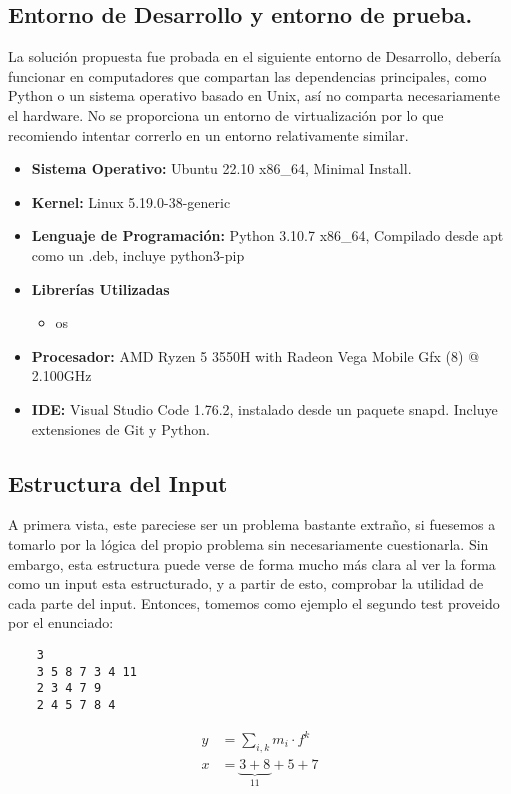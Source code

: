 \documentclass[a4paper]{article}
\begin{document}
\subsection{Entorno de Desarrollo y entorno de prueba.}

La solución propuesta fue probada en el siguiente entorno de Desarrollo, debería funcionar en
computadores que compartan las dependencias principales, como Python o un sistema operativo basado
en Unix, así no comparta necesariamente el hardware. No se proporciona un entorno de virtualización
por lo que recomiendo intentar correrlo en un entorno relativamente similar.

\begin{itemize}
    \item \textbf{Sistema Operativo: } Ubuntu 22.10 x86\_64, Minimal Install.
    \item \textbf{Kernel: }Linux 5.19.0-38-generic
    \item \textbf{Lenguaje de Programación: }Python 3.10.7 x86\_64, Compilado desde apt como un .deb, incluye python3-pip
    \item \textbf{Librerías Utilizadas}
    \begin{itemize}
        \item os
    \end{itemize}
    \item \textbf{Procesador: }AMD Ryzen 5 3550H with Radeon Vega Mobile Gfx (8) @ 2.100GHz 
    \item \textbf{IDE: } Visual Studio Code 1.76.2, instalado desde un paquete snapd. Incluye extensiones
    de Git y Python.
\end{itemize}

\subsection{Estructura del Input}
A primera vista, este pareciese ser un problema bastante extraño, si fuesemos a tomarlo por la lógica
del propio problema sin necesariamente cuestionarla. Sin embargo, esta estructura puede verse de forma mucho
más clara al ver la forma como un input esta estructurado, y a partir de esto, comprobar la
utilidad de cada parte del input. Entonces, tomemos como ejemplo el segundo test proveido por el
enunciado:
\begin{verbatim}
    3 
    3 5 8 7 3 4 11
    2 3 4 7 9 
    2 4 5 7 8 4
\end{verbatim}


\begin{align*}
y &=  \sum\limits_{i,k} m_i \cdot f^k \\
x &=  
\underset{11}{\underbrace{3 + 8}} + 5 + 7
\end{align*}


\end{document}
